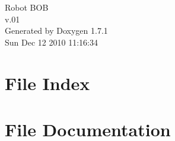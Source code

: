 \documentclass[a4paper]{book}
\begin{document}
\hypersetup{pageanchor=false}
\begin{titlepage}
\vspace*{7cm}
\begin{center}
{\Large Robot BOB \\[1ex]\large v.01 }\\
\vspace*{1cm}
{\large Generated by Doxygen 1.7.1}\\
\vspace*{0.5cm}
{\small Sun Dec 12 2010 11:16:34}\\
\end{center}
\end{titlepage}
\clearemptydoublepage
{}
\tableofcontents
\clearemptydoublepage
{}
\hypersetup{pageanchor=true}
\chapter{File Index}

\chapter{File Documentation}
















\printindex
\end{document}
